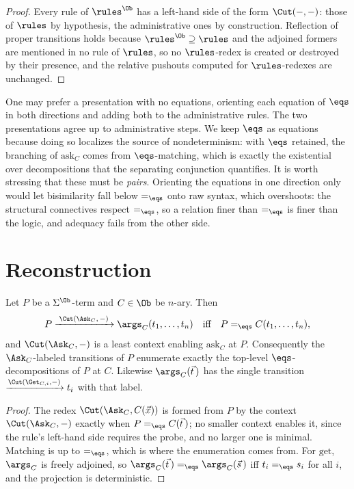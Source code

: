 \begin{proof}
Every rule of $\rules^{\Ob}$ has a left-hand side of the form $\Cut(-,-)$: those of
$\rules$ by hypothesis, the administrative ones by construction. Reflection of
proper transitions holds because $\rules^{\Ob} \supseteq \rules$ and the adjoined
formers are mentioned in no rule of $\rules$, so no $\rules$-redex is created or
destroyed by their presence, and the relative pushouts computed for
$\rules$-redexes are unchanged.
\end{proof}

\begin{remark}
\label{ox:rem:pairs}
One may prefer a presentation with no equations, orienting each equation of
$\eqs$ in both directions and adding both to the administrative rules. The two
presentations agree up to administrative steps. We keep $\eqs$ as equations
because doing so localizes the source of nondeterminism: with $\eqs$ retained, the
branching of $\mathrm{ask}_C$ comes from $\eqs$-matching, which is exactly the
existential over decompositions that the separating conjunction quantifies. It is
worth stressing that these must be \emph{pairs}. Orienting the equations in one
direction only would let bisimilarity fall below $=_{\eqs}$ onto raw syntax, which
overshoots: the structural connectives respect $=_{\eqs}$, so a relation finer than
$=_{\eqs}$ is finer than the logic, and adequacy fails from the other side.
\end{remark}

\section{Reconstruction}
\label{ox:sec:recon}

\begin{lemma}[Exposure]
\label{ox:lem:exposure}
Let $P$ be a $\Sigma^{\Ob}$-term and $C \in \Ob$ be $n$-ary. Then
\[
  P \xrightarrow{\;\Cut(\Ask_C,\,-)\;} \args_C(t_1,\dots,t_n)
  \quad\text{iff}\quad
  P =_{\eqs} C(t_1,\dots,t_n),
\]
and $\Cut(\Ask_C,-)$ is a least context enabling $\mathrm{ask}_C$ at $P$.
Consequently the $\Ask_C$-labeled transitions of $P$ enumerate exactly the
top-level $\eqs$-decompositions of $P$ at $C$. Likewise $\args_C(\vec t\,)$ has the
single transition $\xrightarrow{\Cut(\Get_{C,i},-)} t_i$ with that label.
\end{lemma}

\begin{proof}
The redex $\Cut(\Ask_C, C(\vec x))$ is formed from $P$ by the context
$\Cut(\Ask_C,-)$ exactly when $P =_{\eqs} C(\vec t\,)$; no smaller context enables
it, since the rule's left-hand side requires the probe, and no larger one is
minimal. Matching is up to $=_{\eqs}$, which is where the enumeration comes from.
For $\mathrm{get}$, $\args_C$ is freely adjoined, so
$\args_C(\vec t\,) =_{\eqs} \args_C(\vec s\,)$ iff $t_i =_{\eqs} s_i$ for all $i$,
and the projection is deterministic.
\end{proof}


